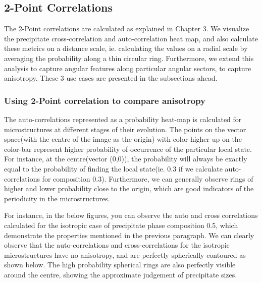 \documentclass[12pt, a4paper]{report}
\begin{document}
\subsection{2-Point Correlations}
The 2-Point correlations are calculated as explained in Chapter 3. We visualize the precipitate cross-correlation and auto-correlation heat map, and also calculate these metrics on a distance scale, ie. calculating the values on a radial scale by averaging the probability along a thin circular ring. Furthermore, we extend this analysis to capture angular features along particular angular sectors, to capture anisotropy. These 3 use cases are presented in the subsections ahead.

\subsubsection{Using 2-Point correlation to compare anisotropy}
The auto-correlations represented as a probability heat-map is calculated for microstructures at different stages of their evolution. The points on the vector space(with the centre of the image as the origin) with color higher up on the color-bar represent higher probability of occurrence of the particular local state. For instance, at the centre(vector (0,0)), the probability will always be exactly equal to the probability of finding the local state(ie. 0.3 if we calculate auto-correlations for composition 0.3). Furthermore, we can generally observe rings of higher and lower probability close to the origin, which are good indicators of the periodicity in the microstructures.  

For instance, in the below figures, you can observe the auto and cross correlations calculated for the isotropic case of precipitate phase composition 0.5, which demonstrate the properties mentioned in the previous paragraph. We can clearly observe that the auto-correlations and cross-correlations for the isotropic microstructures have no anisotropy, and are perfectly spherically contoured as shown below. The high probability spherical rings are also perfectly visible around the centre, showing the approximate judgement of precipitate sizes. 
\end{document}
